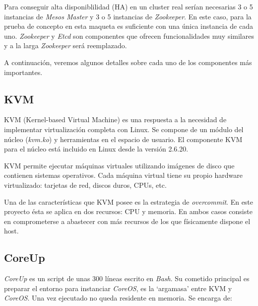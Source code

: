 \documentclass[a4paper,12pt,spanish,final]{epsc_tfc_pfc}
\begin{document}
Para conseguir alta disponiblilidad (HA) en un cluster real serían necesarias 3 o 5 instancias de \emph{Mesos Master} y 3 o 5 instancias de \emph{Zookeeper}. En este caso, para la prueba de concepto en esta maqueta es suficiente con una única instancia de cada uno. \emph{Zookeeper} y \emph{Etcd} son componentes que ofrecen funcionalidades muy similares y a la larga \emph{Zookeeper} será reemplazado.

A continuación, veremos algunos detalles sobre cada uno de los componentes más importantes.

\subsection{KVM}

KVM (Kernel-based Virtual Machine) es una respuesta a la necesidad de implementar virtualización completa con Linux. Se compone de un módulo del núcleo (\emph{kvm.ko}) y herramientas en el espacio de usuario. El componente KVM para el núcleo está incluido en Linux desde la versión 2.6.20.

KVM permite ejecutar máquinas virtuales utilizando imágenes de disco que contienen sistemas operativos. Cada máquina virtual tiene su propio hardware virtualizado: tarjetas de red, discos duros, CPUs, etc.

Una de las características que KVM posee es la estrategia de \emph{overcommit}. En este proyecto ésta se aplica en dos recursos: CPU y memoria. En ambos casos consiste en comprometerse a abastecer con más recursos de los que físicamente dispone el host.

\subsection{CoreUp}

\emph{CoreUp} es un script de unas 300 líneas escrito en \emph{Bash}. Su cometido principal es preparar el entorno para instanciar \emph{CoreOS}, es la `argamasa' entre KVM y \emph{CoreOS}. Una vez ejecutado no queda residente en memoria. Se encarga de:
\end{document}
